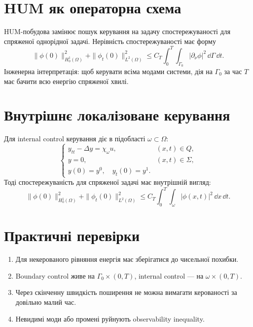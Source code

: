 \section{HUM як операторна схема}

HUM-побудова замінює пошук керування на задачу спостережуваності для спряженої однорідної задачі. Нерівність спостережуваності має форму
\begin{equation}
 \|\phi(0)\|_{H^1_0(\Omega)}^2+\|\phi_t(0)\|_{L^2(\Omega)}^2
 \le C_T\int_0^T\int_{\Gamma_0}|\partial_\nu\phi|^2\,\dd\Gamma\,\dd t.
\end{equation}
Інженерна інтерпретація: щоб керувати всіма модами системи, дія на $\Gamma_0$ за час $T$ має бачити всю енергію спряженої хвилі.

\section{Внутрішнє локалізоване керування}

Для internal control керування діє в підобласті $\omega\subset\Omega$:
\begin{equation}
\begin{cases}
 y_{tt}-\Delta y = \chi_\omega u, & (x,t)\in Q,\\
 y=0, & (x,t)\in\Sigma,\\
 y(0)=y^0,\quad y_t(0)=y^1. &
\end{cases}
\end{equation}
Тоді спостережуваність для спряженої задачі має внутрішній вигляд:
\begin{equation}
 \|\phi(0)\|_{H^1_0(\Omega)}^2+\|\phi_t(0)\|_{L^2(\Omega)}^2
 \le C_T\int_0^T\int_\omega |\phi(x,t)|^2\,\dd x\,\dd t.
\end{equation}

\section{Практичні перевірки}

\begin{enumerate}[label=\arabic*.]
  \item Для некерованого рівняння енергія має зберігатися до чисельної похибки.
  \item Boundary control живе на $\Gamma_0\times(0,T)$, internal control --- на $\omega\times(0,T)$.
  \item Через скінченну швидкість поширення не можна вимагати керованості за довільно малий час.
  \item Невидимі моди або промені руйнують observability inequality.
\end{enumerate}
